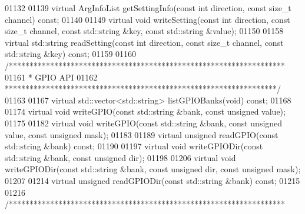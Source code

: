 \begin{DoxyCode}
01132 
01139     \textcolor{keyword}{virtual} ArgInfoList getSettingInfo(\textcolor{keyword}{const} \textcolor{keywordtype}{int} direction, \textcolor{keyword}{const} \textcolor{keywordtype}{size\_t} channel) \textcolor{keyword}{const};
01140 
01149     \textcolor{keyword}{virtual} \textcolor{keywordtype}{void} writeSetting(\textcolor{keyword}{const} \textcolor{keywordtype}{int} direction, \textcolor{keyword}{const} \textcolor{keywordtype}{size\_t} channel, \textcolor{keyword}{const} 
      std::string &key, \textcolor{keyword}{const} std::string &value);
01150 
01158     \textcolor{keyword}{virtual} std::string readSetting(\textcolor{keyword}{const} \textcolor{keywordtype}{int} direction, \textcolor{keyword}{const} \textcolor{keywordtype}{size\_t} channel, \textcolor{keyword}{const} 
      std::string &key) \textcolor{keyword}{const};
01159 
01160     \textcolor{comment}{/*******************************************************************}
01161 \textcolor{comment}{     * GPIO API}
01162 \textcolor{comment}{     ******************************************************************/}
01163 
01167     \textcolor{keyword}{virtual} std::vector<std::string> listGPIOBanks(\textcolor{keywordtype}{void}) \textcolor{keyword}{const};
01168 
01174     \textcolor{keyword}{virtual} \textcolor{keywordtype}{void} writeGPIO(\textcolor{keyword}{const} std::string &bank, \textcolor{keyword}{const} \textcolor{keywordtype}{unsigned} value);
01175 
01182     \textcolor{keyword}{virtual} \textcolor{keywordtype}{void} writeGPIO(\textcolor{keyword}{const} std::string &bank, \textcolor{keyword}{const} \textcolor{keywordtype}{unsigned} value, \textcolor{keyword}{const} \textcolor{keywordtype}{unsigned} 
      mask);
01183 
01189     \textcolor{keyword}{virtual} \textcolor{keywordtype}{unsigned} readGPIO(\textcolor{keyword}{const} std::string &bank) \textcolor{keyword}{const};
01190 
01197     \textcolor{keyword}{virtual} \textcolor{keywordtype}{void} writeGPIODir(\textcolor{keyword}{const} std::string &bank, \textcolor{keyword}{const} \textcolor{keywordtype}{unsigned} dir);
01198 
01206     \textcolor{keyword}{virtual} \textcolor{keywordtype}{void} writeGPIODir(\textcolor{keyword}{const} std::string &bank, \textcolor{keyword}{const} \textcolor{keywordtype}{unsigned} dir, \textcolor{keyword}{const} \textcolor{keywordtype}{unsigned} 
      mask);
01207 
01214     \textcolor{keyword}{virtual} \textcolor{keywordtype}{unsigned} readGPIODir(\textcolor{keyword}{const} std::string &bank) \textcolor{keyword}{const};
01215 
01216     \textcolor{comment}{/*******************************************************************}

\end{DoxyCode}
